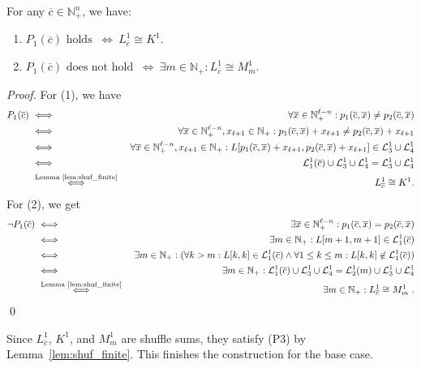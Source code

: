 \documentclass[envcountsame]{llncs}
\renewcommand{\L}{\mathcal L}
\newcommand{\N}{\mathbb N}
\renewcommand{\L}{\mathcal L}
\begin{document}
\begin{lemma}
For any $\overline{c}\in \N^n_+$, we have:
\begin{enumerate}[(1)]
\item $P_1(\overline{c}) \text{ holds } \ \Longleftrightarrow \ L^1_{\overline{c}} \cong K^1$.
\item $P_1(\overline{c}) \text{ does not hold } \ 
\Longleftrightarrow \ \exists m\in \N_+:  L^1_{\overline{c}} \cong M^1_m.$
\end{enumerate}
\end{lemma}
\begin{proof}
For (1), we have 
\begin{eqnarray*}
P_1(\overline{c}) \ & \Longleftrightarrow & \  
\forall \overline{x}\in \N^{\ell-n}_+ : p_1(\overline{c},\overline{x}) \neq p_2(\overline{c},\overline{x}) \\
&  \Longleftrightarrow & \  \forall \overline{x}\in \N^{\ell-n}_+, x_{\ell+1}\in \N_+ :  p_1(\overline{c},\overline{x})+x_{\ell+1}\neq p_2(\overline{c},\overline{x})+x_{\ell+1} \\
 & \Longleftrightarrow & \  \forall \overline{x}\in \N^{\ell-n}_+, x_{\ell+1}\in \N_+ :  L[p_1(\overline{c},\overline{x})+x_{\ell+1}, p_2(\overline{c},\overline{x})+x_{\ell+1}] \in \L^1_3\cup \L^1_4 \\
 & \Longleftrightarrow & \   \L^1_1(\overline{c})\cup \L^1_3 \cup \L^1_4 =
 \L^1_3\cup \L^1_4\\
& \stackrel{\text{Lemma~\ref{lem:shuf_finite}}}{\Longleftrightarrow} & \ L^1_{\overline{c}} \cong K^1 .
\end{eqnarray*}
For (2), we get
\begin{eqnarray*}
\neg P_1(\overline{c}) \ & \Longleftrightarrow & \  \exists \overline{x}\in \N^{\ell-n}_+ : p_1(\overline{c},\overline{x}) = p_2(\overline{c},\overline{x}) \\
&  \Longleftrightarrow & \  \exists m \in \N_+ :  L[m+1,m+1] \in  \L^1_1(\overline{c}) \\
 & \Longleftrightarrow & \  \exists m \in \N_+ : (\forall k > m:  L[k,k] \in
 \L^1_1(\overline{c}) \wedge \forall 1 \leq k \leq m : L[k,k] \not\in
 \L^1_1(\overline{c})) \\
 & \Longleftrightarrow & \  \exists m\in\N_+: \L^1_1(\overline{c}) \cup \L^1_3 \cup \L^1_4 = \L^1_2(m) \cup \L^1_3\cup \L^1_4 \\
 & \stackrel{\text{Lemma~\ref{lem:shuf_finite}}}{\Longleftrightarrow} & \   \exists m\in \N_+:  L^1_{\overline{c}} \cong M^1_m\ .
\end{eqnarray*}
\qed
\end{proof}
Since $L_{\overline c}^1$, $K^1$, and $M^1_m$ are shuffle sums, they satisfy
(P3) by Lemma~\ref{lem:shuf_finite}.
This finishes the construction for the base case.
\end{document}
